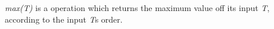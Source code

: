 \textit{max(T)} is a operation which returns the maximum value off its input \textit{T}, according to the input \textit{T}s order.

%
%

\FloatBarrier
